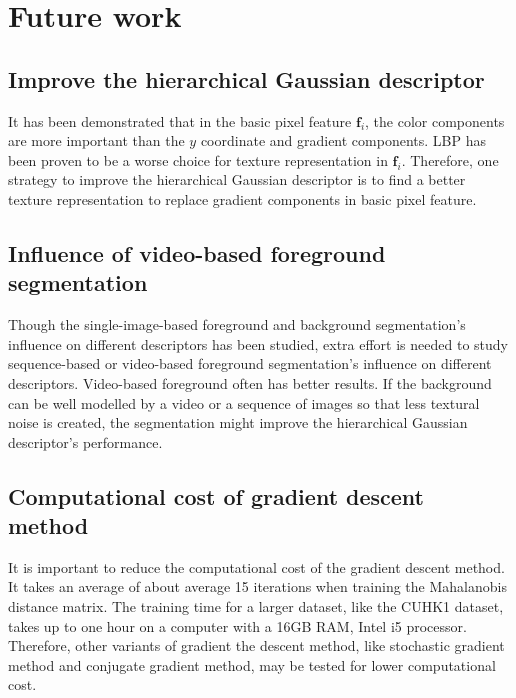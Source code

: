 \section{Future work}
\subsection{Improve the hierarchical Gaussian descriptor}
It has been demonstrated that in the basic pixel feature $\bm{f}_i$, the color components are more important than the $y$ coordinate and gradient components. LBP has been proven to be a worse choice for texture representation in $\bm{f}_i$. Therefore, one strategy to improve the hierarchical Gaussian descriptor is to find a better texture representation to replace gradient components in basic pixel feature. 
\subsection{Influence of video-based foreground segmentation}
Though the single-image-based foreground and background segmentation's influence on different descriptors has been studied, extra effort is needed to study sequence-based or video-based foreground segmentation's influence on different descriptors. Video-based foreground often has better results. If the background can be well modelled by a video or a sequence of images so that less textural noise is created, the segmentation might improve the hierarchical Gaussian descriptor's performance.
\subsection{Computational cost of gradient descent method}
It is important to reduce the computational cost of the gradient descent method. It takes an average of about average 15 iterations when training the Mahalanobis distance matrix. The training time for a larger dataset, like the CUHK1 dataset, takes up to one hour on a computer with a 16GB RAM, Intel i5 processor. Therefore, other variants of gradient the descent method, like stochastic gradient method and conjugate gradient method, may be tested for lower computational cost.



